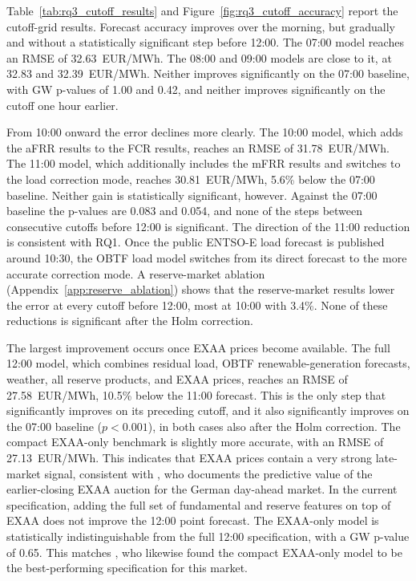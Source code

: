 Table~\ref{tab:rq3_cutoff_results} and Figure~\ref{fig:rq3_cutoff_accuracy}
report the cutoff-grid results. Forecast accuracy improves over the morning, but
gradually and without a statistically significant step before 12:00. The 07:00
model reaches an RMSE of 32.63~EUR/MWh. The 08:00 and 09:00 models are close to
it, at 32.83 and 32.39~EUR/MWh. Neither improves significantly on the 07:00
baseline, with GW p-values of 1.00 and 0.42, and neither improves
significantly on the cutoff one hour earlier.

From 10:00 onward the error declines more clearly. The 10:00 model, which adds
the aFRR results to the FCR results, reaches an RMSE of 31.78~EUR/MWh. The 11:00
model, which additionally includes the mFRR results and switches to the load
correction mode, reaches 30.81~EUR/MWh, 5.6\% below the 07:00 baseline. Neither
gain is statistically significant, however. Against the 07:00 baseline the
p-values are 0.083 and 0.054, and none of the steps between consecutive cutoffs
before 12:00 is significant. The direction of the 11:00 reduction is consistent
with RQ1. Once the public \mbox{ENTSO-E} load forecast is published around
10:30, the OBTF load model switches from its direct forecast to the more
accurate correction mode. A reserve-market ablation
(Appendix~\ref{app:reserve_ablation}) shows that the reserve-market results lower
the error at every cutoff before 12:00, most at 10:00 with 3.4\%. None of these
reductions is significant after the Holm correction.

The largest improvement occurs once EXAA prices become available. The full
12:00 model, which combines residual load, OBTF renewable-generation forecasts,
weather, all reserve products, and EXAA prices, reaches an RMSE of
27.58~EUR/MWh, 10.5\% below the 11:00 forecast. This is the only step that
significantly improves on its preceding cutoff, and it also significantly
improves on the 07:00 baseline (\(p<0.001\)), in both cases also after the Holm
correction. The compact EXAA-only benchmark is slightly more accurate, with an
RMSE of 27.13~EUR/MWh. This indicates that EXAA prices contain a very strong late-market
signal, consistent with \textcite{ziel2015exaa}, who documents the predictive
value of the earlier-closing EXAA auction for the German day-ahead market. In
the current specification, adding the full set of fundamental and reserve
features on top of EXAA does not improve the 12:00 point forecast. The
EXAA-only model is statistically indistinguishable from the full 12:00
specification, with a GW p-value of 0.65. This matches
\textcite{eiser2026operational}, who likewise found the compact EXAA-only model
to be the best-performing specification for this market.

